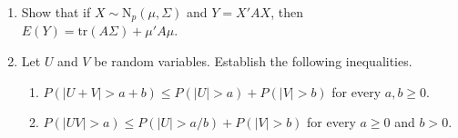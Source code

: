 \documentclass[11pt]{article}
\begin{document}
\begin{enumerate}
\item Show that if $X \sim \text{N}_{p}(\mu, \Sigma)$ and $Y = X'AX$, then $E(Y) = \text{tr}(A\Sigma) + \mu'A\mu$.

\item Let $U$ and $V$ be random variables.  Establish the following inequalities.
\begin{enumerate}
\item $P(|U+V| > a + b) \le P(|U| > a) + P(|V| > b)$ for every $a,b \ge 0$.
\item $P(|UV| > a) \le P(|U| > a/b) + P(|V| > b)$ for every $a \ge 0$ and $b > 0$.
\end{enumerate}

\end{enumerate}
\end{document}

